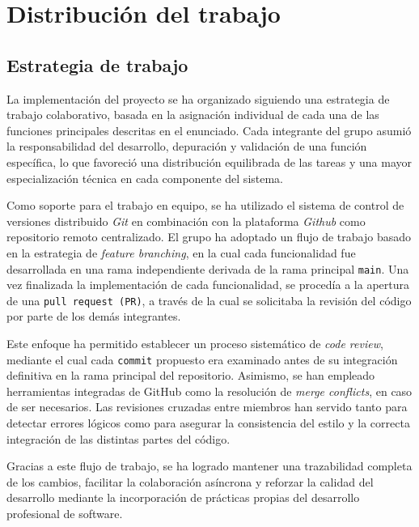 \documentclass[11pt,a4paper]{article}
\begin{document}
\section{Distribución del trabajo}
\subsection{Estrategia de trabajo}
La implementación del proyecto se ha organizado siguiendo una estrategia de trabajo colaborativo, basada en la asignación individual de cada una de las funciones principales descritas en el enunciado. Cada integrante del grupo asumió la responsabilidad del desarrollo, depuración y validación de una función específica, lo que favoreció una distribución equilibrada de las tareas y una mayor especialización técnica en cada componente del sistema. \vspace{2ex}

\noindent Como soporte para el trabajo en equipo, se ha utilizado el sistema de control de versiones distribuido \textit{Git} en combinación con la plataforma \textit{Github} como repositorio remoto centralizado. El grupo ha adoptado un flujo de trabajo basado en la estrategia de \textit{feature branching}, en la cual cada funcionalidad fue desarrollada en una rama independiente derivada de la rama principal \texttt{main}. Una vez finalizada la implementación de cada funcionalidad, se procedía a la apertura de una \texttt{pull request (PR)}, a través de la cual se solicitaba la revisión del código por parte de los demás integrantes. \vspace{2ex}

\noindent Este enfoque ha permitido establecer un proceso sistemático de \textit{code review}, mediante el cual cada \texttt{commit} propuesto era examinado antes de su integración definitiva en la rama principal del repositorio. Asimismo, se han empleado herramientas integradas de GitHub como la resolución de \textit{merge conflicts}, en caso de ser necesarios. Las revisiones cruzadas entre miembros han servido tanto para detectar errores lógicos como para asegurar la consistencia del estilo y la correcta integración de las distintas partes del código. \vspace{2ex}

\noindent Gracias a este flujo de trabajo, se ha logrado mantener una trazabilidad completa de los cambios, facilitar la colaboración asíncrona y reforzar la calidad del desarrollo mediante la incorporación de prácticas propias del desarrollo profesional de software.\vspace{2ex}
\end{document}
